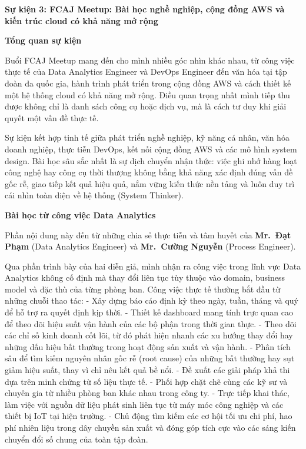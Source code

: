 \vspace{0.5em}\noindent\textbf{Sự kiện 3: FCAJ Meetup: Bài học nghề nghiệp, cộng đồng AWS và
kiến trúc cloud có khả năng mở
rộng}\par

\vspace{0.5em}\noindent\textbf{Tổng quan sự kiện}\par

Buổi FCAJ Meetup mang đến cho mình nhiều góc nhìn khác nhau, từ công
việc thực tế của Data Analytics Engineer và DevOps Engineer đến văn hóa
tại tập đoàn đa quốc gia, hành trình phát triển trong cộng đồng AWS và
cách thiết kế một hệ thống cloud có khả năng mở rộng. Điều quan trọng
nhất mình tiếp thu được không chỉ là danh sách công cụ hoặc dịch vụ, mà
là cách tư duy khi giải quyết một vấn đề thực tế.

Sự kiện kết hợp tinh tế giữa phát triển nghề nghiệp, kỹ năng cá nhân,
văn hóa doanh nghiệp, thực tiễn DevOps, kết nối cộng đồng AWS và các mô
hình system design. Bài học sâu sắc nhất là sự dịch chuyển nhận thức:
việc ghi nhớ hàng loạt công nghệ hay công cụ thời thượng không bằng khả
năng xác định đúng vấn đề gốc rễ, giao tiếp kết quả hiệu quả, nắm vững
kiến thức nền tảng và luôn duy trì cái nhìn toàn diện về hệ thống
(System Thinker).

\vspace{0.5em}\noindent\textbf{Bài học từ công việc Data
Analytics}\par

Phần nội dung này đến từ những chia sẻ thực tiễn và tâm huyết của
\textbf{Mr.~Đạt Phạm} (Data Analytics Engineer) và \textbf{Mr.~Cường
Nguyễn} (Process Engineer).

Qua phần trình bày của hai diễn giả, mình nhận ra công việc trong lĩnh
vực Data Analytics không cố định mà thay đổi liên tục tùy thuộc vào
domain, business model và đặc thù của từng phòng ban. Công việc thực tế
thường bắt đầu từ những chuỗi thao tác: - Xây dựng báo cáo định kỳ theo
ngày, tuần, tháng và quý để hỗ trợ ra quyết định kịp thời. - Thiết kế
dashboard mang tính trực quan cao để theo dõi hiệu suất vận hành của các
bộ phận trong thời gian thực. - Theo dõi các chỉ số kinh doanh cốt lõi,
từ đó phát hiện nhanh các xu hướng thay đổi hay những dấu hiệu bất
thường trong hoạt động sản xuất và vận hành. - Phân tích sâu để tìm kiếm
nguyên nhân gốc rễ (root cause) của những bất thường hay sụt giảm hiệu
suất, thay vì chỉ nêu kết quả bề nổi. - Đề xuất các giải pháp khả thi
dựa trên minh chứng từ số liệu thực tế. - Phối hợp chặt chẽ cùng các kỹ
sư và chuyên gia từ nhiều phòng ban khác nhau trong công ty. - Trực tiếp
khai thác, làm việc với nguồn dữ liệu phát sinh liên tục từ máy móc công
nghiệp và các thiết bị IoT tại hiện trường. - Chủ động tìm kiếm các cơ
hội tối ưu chi phí, hao phí nhiên liệu trong dây chuyền sản xuất và đóng
góp tích cực vào các sáng kiến chuyển đổi số chung của toàn tập đoàn.


